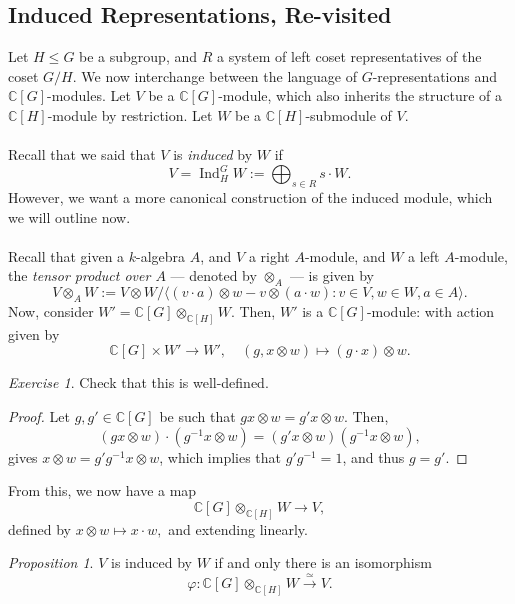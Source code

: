 \documentclass[a4paper]{report}
\theoremstyle{definition}
\theoremstyle{remark}
\theoremstyle{proposition}
\newtheorem{proposition}{Proposition}
\theoremstyle{conjecture}
\theoremstyle{lemma}
\theoremstyle{corollary}
\theoremstyle{exercise}
\newtheorem{exercise}{Exercise}
\theoremstyle{example}
\newcommand{\C}{\mathbb{C}}
\newcommand{\on}{\operatorname}
\begin{document}
\subsection{Induced Representations, Re-visited}

Let $H\leq G$ be a subgroup, and $R$ a system of left coset representatives 
of the coset $G/H$. We now interchange between the language of 
$G$-representations and $\C[G]$-modules. Let $V$ be a $\C[G]$-module,
which also inherits the structure of a $\C[H]$-module by 
restriction. Let $W$ be a $\C[H]$-submodule of $V$.\\\\
Recall that we said that $V$ is \emph{induced} by $W$ if 
$$V = \on{Ind}_H^G W := \bigoplus_{s \in R} s\cdot W.$$
However, we want a more canonical construction of the induced module, which we
will outline now.\\\\
Recall that given a $k$-algebra $A$, and $V$ a right $A$-module,  
and $W$ a left $A$-module, the \emph{tensor product over $A$} --- denoted by $\otimes_A$ --- is given by 
$$V\otimes_A W := V\otimes W / \langle (v\cdot a)\otimes w - v\otimes (a\cdot w) : v\in V, w\in W, a\in A\rangle.$$
Now, consider $W' = \C[G] \otimes_{\C[H]} W$. Then, $W'$ is a $\C[G]$-module:
with action given by 
$$\C[G] \times W' \longrightarrow W', \quad (g,x\otimes w)\longmapsto (g\cdot x) \otimes w.$$

\begin{exercise}
    Check that this is well-defined.
\end{exercise}

\begin{proof}
    Let $g,g' \in \C[G]$ be such that 
    $gx\otimes w = g'x\otimes w$.
    Then, $$ (gx\otimes w)\cdot (g^{-1}x\otimes w) = (g'x\otimes w) (g^{-1}x\otimes w),$$
    gives $x\otimes w = g'g^{-1}x\otimes w$, which implies that 
    $g'g^{-1} = 1$, and thus $g = g'$.
\end{proof}

From this, we now have a map 
$$\C[G]\otimes_{\C[H]} W \longrightarrow V,$$
defined by $x\otimes w \mapsto x\cdot w,$ and extending linearly.

\begin{proposition}
    $V$ is induced by $W$ if and only there is an isomorphism
    $$\varphi :\C[G]\otimes_{\C[H]}W \stackrel{\simeq}{\longrightarrow} V.$$
\end{proposition}
\end{document}
